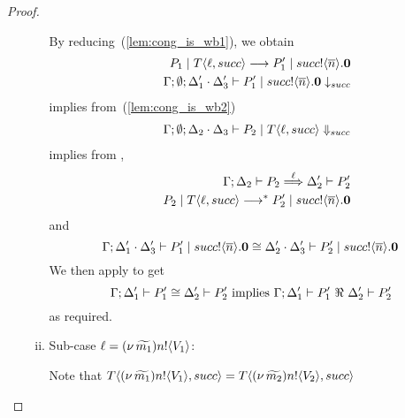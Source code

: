 \begin{proof}
\begin{enumerate}
\begin{enumerate}[i.]
						\noi By reducing~(\ref{lem:cong_is_wb1}), we obtain
						\begin{eqnarray*}
							&& P_1 \;|\; T\langle \ell, succ \rangle \longrightarrow P_1' \;|\; succ ! \langle \overline{n} \rangle . \mathbf{0} \\
							&& \Gamma; \emptyset; \Delta_1' \cdot \Delta_3' \vdash P_1' \;|\; succ ! \langle \overline{n} \rangle . \mathbf{0} \downarrow_{succ}
						\end{eqnarray*}
						\noi implies from~(\ref{lem:cong_is_wb2})
						\begin{eqnarray*}
							&& \Gamma; \emptyset; \Delta_2 \cdot \Delta_3 \vdash P_2 \;|\; T\langle \ell, succ \rangle \Downarrow_{succ}
						\end{eqnarray*}
						\noi implies from ,
						\begin{eqnarray*}
							&& \Gamma; \Delta_2 \vdash P_2 \stackrel{\ell}{\Longrightarrow} \Delta_2' \vdash P_2'\\
							&& P_2 \;|\; T \langle \ell, succ \rangle \longrightarrow^{*} P_2' \;|\; succ ! \langle \overline{n} \rangle . \mathbf{0}
						\end{eqnarray*}
						\noi and
						\[
							\Gamma; \Delta_1' \cdot \Delta_3' \vdash P_1' \;|\; succ ! \langle \overline{n} \rangle .\mathbf{0} \cong \Delta_2' \cdot \Delta_3' \vdash P_2' \;|\; succ ! \langle \overline{n} \rangle . \mathbf{0}
						\]
						We then apply  to get
						\[
							\horel{\Gamma}{\Delta_1'}{P_1'}{\cong}{\Delta_2'}{P_2'} \text{ implies } \horel{\Gamma}{\Delta_1'}{P_1'}{\ \Re\ }{\Delta_2'}{P_2'}
						\]
						\noi as required.

				\item	Sub-case $\ell = (\nu\, \widetilde{m_1}) n ! \langle V_1 \rangle$:

						\noi Note that $T\langle (\nu\, \widetilde{m_1}) n ! \langle V_1 \rangle, succ \rangle = T\langle (\nu\, \widetilde{m_2}) n ! \langle V_2 \rangle, succ \rangle$


\end{enumerate}
\end{enumerate}
\end{proof}
